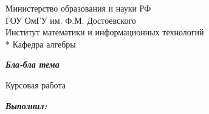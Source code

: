 \begin{titlepage}
	\newpage

	\begin{center}
    	\Large{Министерство образования и науки РФ \\
		       ГОУ ОмГУ им. Ф.М. Достоевского \\}
	    \large{Институт математики и информационных технологий \\*
		       Кафедра алгебры}
	\end{center}

	\vfill\vfill\vfill\vfill

	\begin{center}
		\LARGE\textbf{\textit{Бла-бла тема}}
	\end{center}

	\vfill

	\begin{center}
		\Large{Курсовая работа}
	\end{center}
	
	\vfill\vfill\vfill\vfill
	
	\begin{singlespace}
    \large {
        {}\hspace{9.5cm}\textbf{\textit{Выполнил:}}

        {}\hspace{9.5cm}{студент группы МПС-703-О}

        {}\hspace{9.5cm}{специальности <<Прикладная}

        {}\hspace{9.5cm}{математика и информатика>>}

        {} \vspace{2mm}

        {}\hspace{9.5cm}{\underline{{}\hspace{5cm}{}}} \vspace*{-0.7mm}

        {}

        \vspace{10mm}

        {}

        {}\hspace{9.5cm}{д.ф.-м.н., профессор}

}
\end{singlespace}
\end{titlepage}

